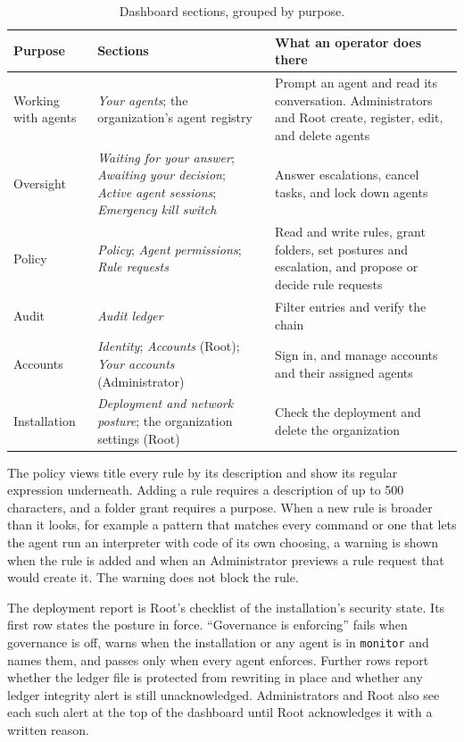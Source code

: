 \begin{table}[htbp]
\centering
\caption{Dashboard sections, grouped by purpose.}
\label{tab:gov-dashboard-sections}
\small
\begin{tabularx}{\textwidth}{@{}>{\raggedright\arraybackslash}p{}>{\raggedright\arraybackslash}p{}>{\raggedright\arraybackslash}X@{}}
\toprule
\textbf{Purpose} & \textbf{Sections} & \textbf{What an operator does
there} \\
\midrule
Working with agents & \textit{Your agents}; the organization's agent
registry & Prompt an agent and read its conversation. Administrators and
Root create, register, edit, and delete agents \\
Oversight & \textit{Waiting for your answer}; \textit{Awaiting your
decision}; \textit{Active agent sessions}; \textit{Emergency kill switch} &
Answer escalations, cancel tasks, and lock down agents \\
Policy & \textit{Policy}; \textit{Agent permissions}; \textit{Rule
requests} & Read and write rules, grant folders, set postures and
escalation, and propose or decide rule requests \\
Audit & \textit{Audit ledger} & Filter entries and verify the chain \\
Accounts & \textit{Identity}; \textit{Accounts} (Root); \textit{Your
accounts} (Administrator) & Sign in, and manage accounts and their
assigned agents \\
Installation & \textit{Deployment and network posture}; the organization
settings (Root) & Check the deployment and delete the organization \\
\bottomrule
\end{tabularx}
\end{table}

The policy views title every rule by its description and show its
regular expression underneath. Adding a rule requires a description of up
to 500 characters, and a folder grant requires a purpose. When a new rule
is broader than it looks, for example a pattern that matches every command
or one that lets the agent run an interpreter with code of its own
choosing, a warning is shown when the rule is added and when an
Administrator previews a rule request that would create it. The warning
does not block the rule.

The deployment report is Root's checklist of the installation's security
state. Its first row states the posture in force. ``Governance is
enforcing'' fails when governance is off, warns when the installation or
any agent is in \texttt{monitor} and names them, and passes only when every
agent enforces. Further rows report whether the ledger file is protected
from rewriting in place and whether any ledger integrity alert is still
unacknowledged. Administrators and Root also see each such alert at the
top of the dashboard until Root acknowledges it with a written reason.

